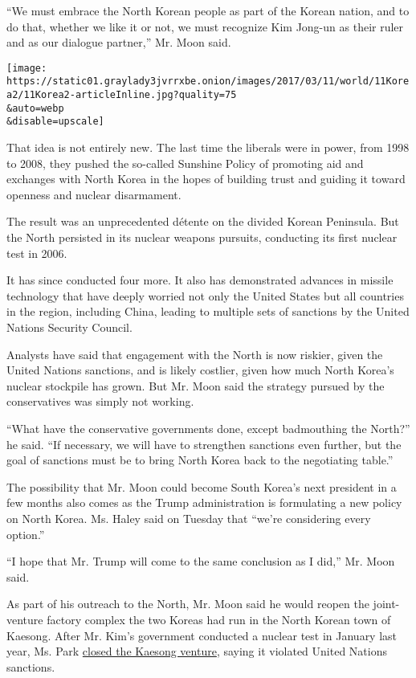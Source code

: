 ``We must embrace the North Korean people as part of the Korean nation,
and to do that, whether we like it or not, we must recognize Kim Jong-un
as their ruler and as our dialogue partner,'' Mr. Moon said.

\texttt{[image: https://static01.graylady3jvrrxbe.onion/images/2017/03/11/world/11Korea2/11Korea2-articleInline.jpg?quality=75\\\&auto=webp\\\&disable=upscale]}

That idea is not entirely new. The last time the liberals were in power,
from 1998 to 2008, they pushed the so-called Sunshine Policy of
promoting aid and exchanges with North Korea in the hopes of building
trust and guiding it toward openness and nuclear disarmament.

The result was an unprecedented détente on the divided Korean Peninsula.
But the North persisted in its nuclear weapons pursuits, conducting its
first nuclear test in 2006.

It has since conducted four more. It also has demonstrated advances in
missile technology that have deeply worried not only the United States
but all countries in the region, including China, leading to multiple
sets of sanctions by the United Nations Security Council.

Analysts have said that engagement with the North is now riskier, given
the United Nations sanctions, and is likely costlier, given how much
North Korea's nuclear stockpile has grown. But Mr. Moon said the
strategy pursued by the conservatives was simply not working.

``What have the conservative governments done, except badmouthing the
North?'' he said. ``If necessary, we will have to strengthen sanctions
even further, but the goal of sanctions must be to bring North Korea
back to the negotiating table.''

The possibility that Mr. Moon could become South Korea's next president
in a few months also comes as the Trump administration is formulating a
new policy on North Korea. Ms. Haley said on Tuesday that ``we're
considering every option.''

``I hope that Mr. Trump will come to the same conclusion as I did,'' Mr.
Moon said.

As part of his outreach to the North, Mr. Moon said he would reopen the
joint-venture factory complex the two Koreas had run in the North Korean
town of Kaesong. After Mr. Kim's government conducted a nuclear test in
January last year, Ms. Park
\href{https://www.nytimes3xbfgragh.onion/2016/02/11/world/asia/north-south-korea-kaesong.html}{closed
the Kaesong venture}, saying it violated United Nations sanctions.

